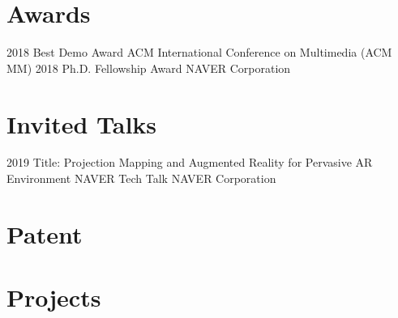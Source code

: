 \documentclass[]{friggeri-cv}
\begin{document}
\begin{refsection}
  \nocite{*}
  \printbibliography[
    type=inproceedings, 
    title=\textbf{Conference proceedings}, 
    heading=subbibliography,
    keyword={selected}
  ]
\end{refsection}

\par\null\par\null\par
\section{Awards}

\begin{entrylist}
  \entry
    {2018}
    {Best Demo Award}
    {}
    {ACM International Conference on Multimedia (ACM MM)}
\entry
    {2018}
    {Ph.D. Fellowship Award}
    {}
    {NAVER Corporation}
\end{entrylist}

\clearpage
\section{Invited Talks}

\begin{entrylist}
\entry
    {2019}
    {Title: Projection Mapping and Augmented Reality for Pervasive AR \\Environment}
    {NAVER Tech Talk}
    {NAVER Corporation}
\end{entrylist}

\section{Patent}

\begin{refsection}
  \nocite{*}
  \printbibliography[
    type=misc, 
    title=\textbf{Domestic (Korea)}, 
    heading=subbibliography,
    keyword={patent}
  ]
\end{refsection}

\section{Projects}
\end{document}
